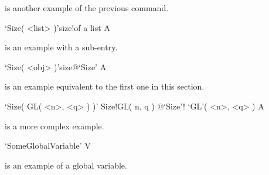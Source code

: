 is another example of the previous command.

\>`Size( <list> )'{size!of a list} A

is an example with a sub-entry.

\>`Size( <obj> )'{size}@{`Size'} A

is an example equivalent to the first one in this section.

\>`Size( GL( <n>, <q> ) )'%
{Size!GL( n, q )}%
@{`Size'! `GL'( \noexpand<n>, \noexpand<q> )} A

is a more complex example.

\>`SomeGlobalVariable' V

is an example of a global variable.

